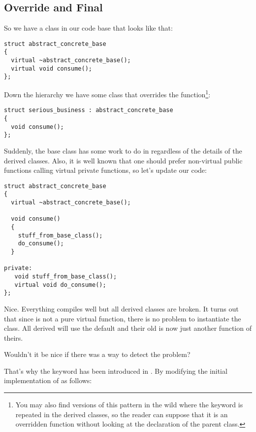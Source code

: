 \subsection{Override and Final}

\problemtitle

So we have a class in our  code base that looks like that:

\begin{lstlisting}
struct abstract_concrete_base
{
  virtual ~abstract_concrete_base();
  virtual void consume();
};
\end{lstlisting}

Down the hierarchy we have some class that overrides the
 function\footnote{You may also find versions of this
pattern in the wild where the  keyword is repeated in
the derived classes, so the reader can suppose that it is an
overridden function without looking at the declaration of the parent
class.}:

\begin{lstlisting}
struct serious_business : abstract_concrete_base
{
  void consume();
};
\end{lstlisting}

Suddenly, the base class has some work to do in 
regardless of the details of the derived classes. Also, it is well
known that one should prefer non-virtual public functions calling
virtual private functions, so let's update our code:

\begin{lstlisting}
struct abstract_concrete_base
{
  virtual ~abstract_concrete_base();

  void consume()
  {
    stuff_from_base_class();
    do_consume();
  }

private:
   void stuff_from_base_class();
   virtual void do_consume();
};
\end{lstlisting}

Nice. Everything compiles well but all derived classes are broken. It
turns out that since  is not a pure virtual
function, there is no problem to instantiate the class. All derived
will use the default  and their old
 is now just another function of theirs.

Wouldn't it be nice if there was a way to detect the problem?

\solutiontitle

That's why the  keyword has been introduced in
. By modifying the initial implementation of
 as follows:

